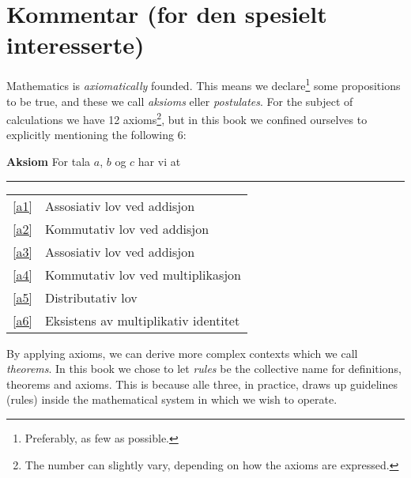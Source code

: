



	
\section*{Kommentar (for den spesielt interesserte) \label{Kommentar1}}
Mathematics is \textit{axiomatically} founded. This means we declare\footnote{Preferably, as few as possible.} some propositions to be true, and these we call \textit{aksioms} eller \textit{postulates}. For the subject of calculations we have 12 axioms\footnote{The number can slightly vary, depending on how the axioms are expressed.}, but in this book we confined ourselves to explicitly mentioning the following 6:
\regv 

\begin{tcolorbox}[boxrule=0.3 mm,arc=0mm,colback=blue!5] {\large \textbf{Aksiom} \vspace{5 pt}}\newline
For tala $ a $, $ b $ og $ c $ har vi at
\rule{1\linewidth}{0.75bp}
\begin{center}
	\begin{tabular}{rl}
		\eqref{a1} &Assosiativ lov ved addisjon\\
		\eqref{a2} & Kommutativ lov ved addisjon \\	
		\eqref{a3} & Assosiativ lov ved addisjon \\
		\eqref{a4} & Kommutativ lov ved multiplikasjon \\		
		\eqref{a5} & Distributativ lov\\	
		\eqref{a6} & Eksistens av multiplikativ identitet
	\end{tabular}
\end{center}
\end{tcolorbox}
\vsk
By applying axioms, we can derive more complex contexts which we call \textit{theorems}. In this book we chose to let \textsl{rules} be the collective name for definitions, theorems and axioms. This is because alle three, in practice, draws up guidelines (rules) inside the mathematical system in which we wish to operate.\vsk
